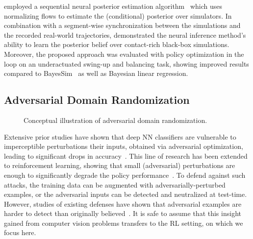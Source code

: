 \documentclass[utf8]{frontiersSCNS} %
\begin{document}
\citet{Muratore_Peters_21_CoRL} employed a sequential neural posterior estimation algorithm~\citep{Greenberg_Macke_19} which uses normalizing flows to estimate the (conditional) posterior over simulators.
In combination with a segment-wise synchronization between the simulations and the recorded real-world trajectories, \citet{Muratore_Peters_21_CoRL} demonstrated the neural inference method's ability to learn the posterior belief over contact-rich black-box simulations.
Moreover, the proposed approach was evaluated with policy optimization in the loop on an underactuated swing-up and balancing task, showing improved results compared to BayesSim~\citep{Ramos_Fox_19} as well as Bayesian linear regression.

\subsection{Adversarial Domain Randomization}
\label{sec_sota_adversarial_dr}
	\begin{figure} %
		\raggedleft
		\vspace*{-1.4\baselineskip}
		
		\vspace*{-1.\baselineskip}
	\caption{Conceptual illustration of adversarial domain randomization.}
	\label{fig_sota_adversarial_dr}
	\end{figure}
Extensive prior studies have shown that deep \ac{NN} classifiers are vulnerable to imperceptible perturbations their inputs, obtained via adversarial optimization, leading to significant drops in accuracy~\citep{Szegedy_Fergus_13,Goodfellow_Szegedy_14,Fawzi_Frossard_15,Kurakin_Bengio_17,Ilyas_Madry_19}. %
This line of research has been extended to reinforcement learning, showing that small (adversarial) perturbations are enough to significantly degrade the policy performance~\citep{Huang_Abbeel_17}.
To defend against such attacks, the training data can be augmented with adversarially-perturbed examples, or the adversarial inputs can be detected and neutralized at test-time.
However, studies of existing defenses have shown that adversarial examples are harder to detect than originally believed~\citep{Carlini_Wagner_17}.
It is safe to assume that this insight gained from computer vision problems transfers to the \ac{RL} setting, on which we focus here.
\end{document}
